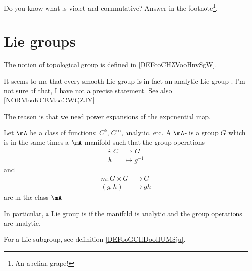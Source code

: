 
Do you know what is violet and commutative? Answer in the footnote\footnote{An abelian grape!}.


\section{Lie groups}

The notion of topological group is defined in \ref{DEFooCHZVooHnvSgW}.

\begin{probleme}
	It seems to me that every smooth Lie group is in fact an analytic Lie group \cite{BIBooIMFVooPoybEp,BIBooTKQTooGjFxwB}. I'm not sure of that, I have not a precise statement. See also \ref{NORMooKCBMooGWQZJY}.

	The reason is that we need power expansions of the exponential map.
\end{probleme}

\begin{definition}      \label{DEFooGDWTooTvINuw}
	Let \( \mA\) be a class of functions: \( C^k\), \(  C^{\infty}\), analytic, etc. A \( \mA\)- is a group $G$ which is in the same times a \( \mA\)-manifold such that the group operations
	\begin{equation}
		\begin{aligned}
			i\colon G & \to G          \\
			h         & \mapsto g^{-1}
		\end{aligned}
	\end{equation}
	and
	\begin{equation}
		\begin{aligned}
			m\colon G\times G & \to G      \\
			(g,h)             & \mapsto gh
		\end{aligned}
	\end{equation}
	are in the class \( \mA\).

	In particular, a Lie group is  if the manifold is analytic and the group operations are analytic.

\end{definition}
For a Lie subgroup, see definition \ref{DEFooGCHDooHUMSju}.

